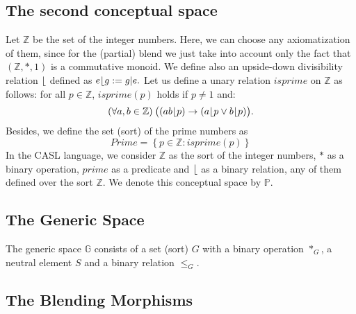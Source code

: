 \subsection{The second conceptual space}
Let $\mathbb{Z}$ be the set of the integer numbers. Here, we can
choose any axiomatization of them, since for the (partial) blend we
just take into account only the fact that $(\mathbb{Z},*,1)$ is a
commutative monoid.
We define also an upside-down divisibility relation $\lfloor$ defined as
%
$e\lfloor g:=g|e.$
Let us define a unary relation $isprime$ on $\mathbb{Z}$ as
follows: for all $p\in \mathbb{Z}$, $isprime(p)$ holds if $p\neq 1$
and:
%
\[(\forall a,b\in \mathbb{Z})\: \bigl( (ab \lfloor p)\rightarrow (a \lfloor p \vee b \lfloor p) \bigr).\] 
Besides, we define the set (sort) of the prime numbers as 
\[ Prime=\left\{ p\in \mathbb{Z}: isprime(p)\right\}\]
In the CASL language, we consider
$\mathbb{Z}$ as the sort of the integer numbers, $*$ as a binary
operation, $prime$ as a predicate and $\lfloor$ as a binary
relation, any of them defined over the sort $\mathbb{Z}$.
We denote this conceptual space by $\mathbb{P}$.


\subsection{The Generic Space}

The generic space $\mathbb{G}$ consists of a set (sort) $G$ with a
binary operation $*_G$, a neutral element $S$ and a binary relation
$\leq_G$.


\subsection{The Blending Morphisms}

